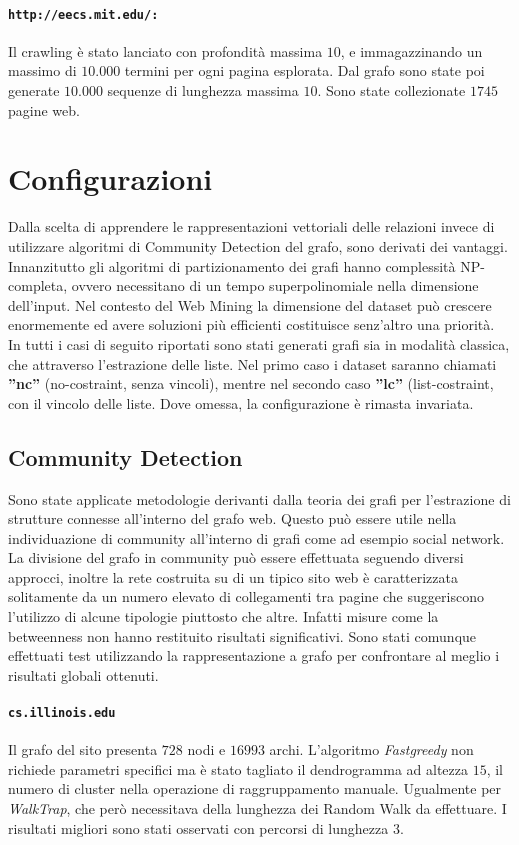 \paragraph{\texttt{http://eecs.mit.edu/:}}
Il crawling è stato lanciato con profondità massima $10$, e immagazzinando un massimo di $10.000$ termini per ogni pagina esplorata. Dal grafo sono state poi generate $10.000$ sequenze di lunghezza massima $10$. Sono state collezionate $1745$ pagine web.

\section{Configurazioni}
Dalla scelta di apprendere le rappresentazioni vettoriali delle relazioni invece di utilizzare algoritmi di Community Detection del grafo, sono derivati dei vantaggi. Innanzitutto gli algoritmi di partizionamento dei grafi hanno complessità NP-completa, ovvero necessitano di un tempo superpolinomiale nella dimensione dell'input. Nel contesto del Web Mining la dimensione del dataset può crescere enormemente ed avere soluzioni più efficienti costituisce senz'altro una priorità. 
\\
In tutti i casi di seguito riportati sono stati generati grafi sia in modalità classica, che attraverso l'estrazione delle liste. Nel primo caso i dataset saranno chiamati \textbf{''nc''} (no-costraint, senza vincoli), mentre nel secondo caso \textbf{''lc''} (list-costraint, con il vincolo delle liste. Dove omessa, la configurazione è rimasta invariata.

\subsection{Community Detection}
Sono state applicate metodologie derivanti dalla teoria dei grafi per l'estrazione di strutture connesse all'interno del grafo web. Questo può essere utile nella individuazione di community all'interno di grafi come ad esempio social network. La divisione del grafo in community può essere effettuata seguendo diversi approcci, inoltre la rete costruita su di un tipico sito web è caratterizzata solitamente da un numero elevato di collegamenti tra pagine che suggeriscono l'utilizzo di alcune tipologie piuttosto che altre. Infatti misure come la betweenness non hanno restituito risultati significativi.
Sono stati comunque effettuati test utilizzando la rappresentazione a grafo per confrontare al meglio i risultati globali ottenuti.
 
\paragraph{\texttt{cs.illinois.edu}} Il grafo del sito presenta $728$ nodi e $16993$ archi. L'algoritmo \textit{Fastgreedy} non richiede parametri specifici ma è stato tagliato il dendrogramma ad altezza $15$, il numero di cluster nella operazione di raggruppamento manuale. Ugualmente per \textit{WalkTrap}, che però necessitava della lunghezza dei Random Walk da effettuare. I risultati migliori sono stati osservati con percorsi di lunghezza $3$.

